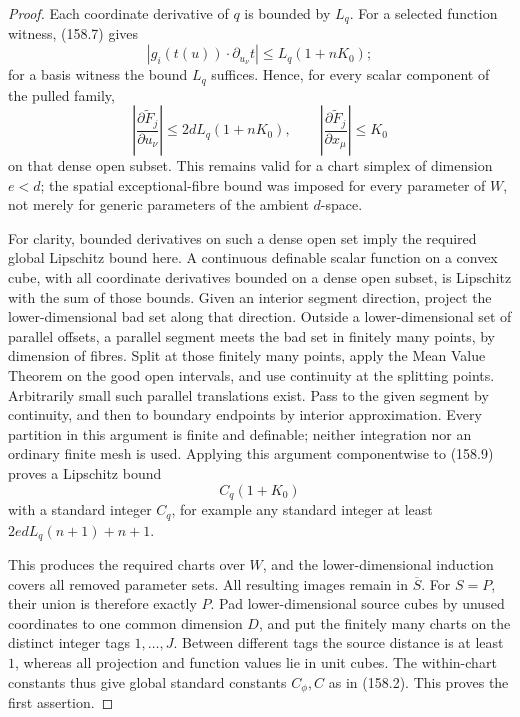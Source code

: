 \begin{proof}
Each coordinate derivative of \(q\) is bounded by \(L_q\).
For a selected function witness, (158.7) gives
\[
 |g_i(t(u))\cdot\partial_{u_\nu}t|
       \le L_q(1+nK_0);
\]
for a basis witness the bound \(L_q\) suffices. Hence, for every
scalar component of the pulled family,
\[
 \left|\frac{\partial\widetilde F_j}{\partial u_\nu}\right|
 \le 2d L_q(1+nK_0),\qquad
 \left|\frac{\partial\widetilde F_j}{\partial x_\mu}\right|
 \le K_0
 \tag{158.9}
\]
on that dense open subset. This remains valid for a chart
simplex of dimension \(e<d\); the spatial exceptional-fibre
bound was imposed for every parameter of \(W\), not merely
for generic parameters of the ambient \(d\)-space.

For clarity, bounded derivatives on such a dense open set imply
the required global Lipschitz bound here. A continuous definable
scalar function on a convex cube, with all coordinate derivatives
bounded on a dense open subset, is Lipschitz with the sum of
those bounds. Given an interior segment direction, project the
lower-dimensional bad set along that direction. Outside a
lower-dimensional set of parallel offsets, a parallel segment
meets the bad set in finitely many points, by dimension of
fibres. Split at those finitely many points, apply the Mean
Value Theorem on the good open intervals, and use continuity
at the splitting points. Arbitrarily small such parallel
translations exist. Pass to the given segment by continuity,
and then to boundary endpoints by interior approximation.
Every partition in this argument is finite and definable;
neither integration nor an ordinary finite mesh is used.
Applying this argument componentwise to (158.9) proves a
Lipschitz bound
\[
 C_q(1+K_0)
\]
with a standard integer \(C_q\), for example any standard
integer at least \(2edL_q(n+1)+n+1\).

This produces the required charts over \(W\), and the
lower-dimensional induction covers all removed parameter
sets. All resulting images remain in \(\overline S\).
For \(S=P\), their union is therefore exactly \(P\).
Pad lower-dimensional source cubes by unused coordinates to
one common dimension \(D\), and put the finitely many charts
on the distinct integer tags \(1,\ldots,J\). Between different
tags the source distance is at least \(1\), whereas all
projection and function values lie in unit cubes. The
within-chart constants thus give global standard constants
\(C_\phi,C\) as in (158.2). This proves the first assertion.


\end{proof}

